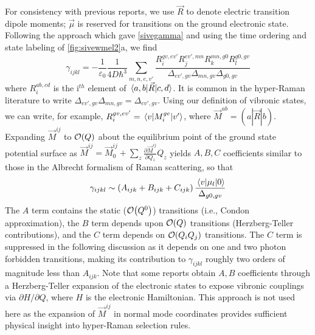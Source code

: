 \documentclass[aip, jcp, reprint, onecolumn, nofootinbib]{revtex4-2}
\begin{document}
For consistency with previous reports, we use $\vec{R}$ to denote electric transition dipole moments; $\vec{\mu}$ is reserved for transitions on the ground electronic state. \cite{Tang1970}
Following the approach which gave \autoref{sivegamma} and using the time ordering and state labeling of \autoref{fig:sivewmel2}a, we find
\begin{equation}\label{drgamma_notaylor}
	\gamma_{ijkl} = -\frac{1}{\varepsilon_0} \frac{1}{4D \hbar^3} \sum_{m,n,e,v'} \frac{
		R_{i}^{gv, ev'} 
		R_{j}^{ev',mn} 
		R_{k}^{mn,g0} 
		R_{l}^{g0,gv} 
	}{	\Delta_{ev', gv}
		\Delta_{mn, gv}
		\Delta_{g0,gv}
	}
\end{equation}
where $R_{i}^{ab,cd}$ is the i$^{th}$ element of $\mel{a,b}{\vec{R}}{c,d}$.
It is common in the hyper-Raman literature to write $\Delta_{ev', gv} \Delta_{mn, gv} = \Delta_{ev', gv}$.
Using our definition of vibronic states, we can write, for example,
$R_{i}^{gv,ev'} = \mel{v}{M_i^{ge}}{v'}$, where $\vec{M}^{ab} = (a|\vec{R}|b)$.\cite{Ziegler1974}
Expanding $\vec{M}^{ij}$ to $\order{Q}$ about the equilibrium point of the ground state potential surface as
$\vec{M}^{ij} = \vec{M}^{ij}_0 + \sum_z \frac{\partial\vec{M}^{ij}}{\partial Q_z} Q_z$
yields $A, B, C$ coefficients similar to those in the Albrecht formalism of Raman scattering, \cite{Albrecht1961, Warshel1977, Ziegler1988} so that
\begin{equation}\label{gammaabc}
		\gamma_{ijkl} \sim \left(A_{ijk} + B_{ijk} + C_{ijk}\right) \frac{\mel{v}{\mu_{l}}{0}} {\Delta_{g0,gv}}
\end{equation}
The $A$ term contains the static ($\order{Q^0}$) transitions (i.e., Condon approximation), the $B$ term depends upon $\order{Q}$ transitions (Herzberg-Teller contributions), and the $C$ term depends on $\order{Q_i Q_j}$ transitions. 
The $C$ term is suppressed in the following discussion as it depends on one and two photon forbidden transitions, making its contribution to $\gamma_{ijkl}$ roughly two orders of magnitude less than $A_{ijk}$. \cite{Ziegler1988, Neddersen1989, Bonang1992}
Note that some reports obtain $A, B$ coefficients through a Herzberg-Teller expansion of the electronic states to expose vibronic couplings via $\partial H / \partial Q$, where $H$ is the electronic Hamiltonian.\cite{HerzbergTeller1933, Petrov1985, Neddersen1989, Baranov1990}
This approach is not used here as the expansion of $\vec{M}^{ij}$ in normal mode coordinates provides sufficient physical insight into hyper-Raman selection rules. 
\end{document}
